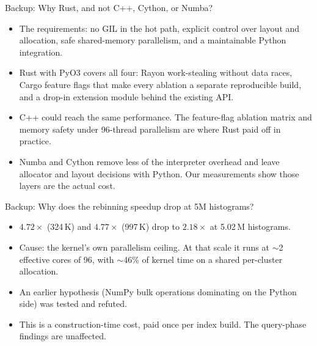 \documentclass[aspectratio=169,10pt]{beamer}
\begin{document}
\begin{frame}{Backup: Why Rust, and not C++, Cython, or Numba?}
  \begin{itemize}
    \item The requirements: no GIL in the hot path, explicit control over layout and allocation, safe shared-memory parallelism, and a maintainable Python integration.
    \item Rust with PyO3 covers all four: Rayon work-stealing without data races, Cargo feature flags that make every ablation a separate reproducible build, and a drop-in extension module behind the existing API.
    \item C++ could reach the same performance. The feature-flag ablation matrix and memory safety under 96-thread parallelism are where Rust paid off in practice.
    \item Numba and Cython remove less of the interpreter overhead and leave allocator and layout decisions with Python. Our measurements show those layers are the actual cost.
  \end{itemize}
\end{frame}

\begin{frame}{Backup: Why does the rebinning speedup drop at 5M histograms?}
  \begin{itemize}
    \item $4.72\times$ (324\,K) and $4.77\times$ (997\,K) drop to $2.18\times$ at 5.02\,M histograms.
    \item Cause: the kernel's own parallelism ceiling. At that scale it runs at $\sim$2 effective cores of 96, with $\sim$46\% of kernel time on a shared per-cluster allocation.
    \item An earlier hypothesis (NumPy bulk operations dominating on the Python side) was tested and refuted.
    \item This is a construction-time cost, paid once per index build. The query-phase findings are unaffected.
  \end{itemize}
\end{frame}
\end{document}
